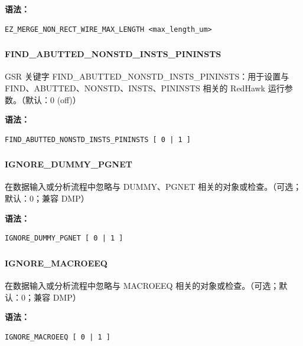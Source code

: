 \textbf{语法：}
\begin{lstlisting}
EZ_MERGE_NON_RECT_WIRE_MAX_LENGTH <max_length_um>
\end{lstlisting}

\subsubsection{}
\paragraph*{FIND_ABUTTED_NONSTD_INSTS_PININSTS}

GSR 关键字 FIND_ABUTTED_NONSTD_INSTS_PININSTS：用于设置与 FIND、ABUTTED、NONSTD、INSTS、PININSTS 相关的 RedHawk 运行参数。（默认：0 (off)）

\textbf{语法：}
\begin{lstlisting}
FIND_ABUTTED_NONSTD_INSTS_PININSTS [ 0 | 1 ]
\end{lstlisting}

\subsubsection{}
\paragraph*{IGNORE_DUMMY_PGNET}

在数据输入或分析流程中忽略与 DUMMY、PGNET 相关的对象或检查。（可选；默认：0；兼容 DMP）

\textbf{语法：}
\begin{lstlisting}
IGNORE_DUMMY_PGNET [ 0 | 1 ]
\end{lstlisting}

\subsubsection{}
\paragraph*{IGNORE_MACROEEQ}

在数据输入或分析流程中忽略与 MACROEEQ 相关的对象或检查。（可选；默认：0；兼容 DMP）

\textbf{语法：}
\begin{lstlisting}
IGNORE_MACROEEQ [ 0 | 1 ]
\end{lstlisting}

